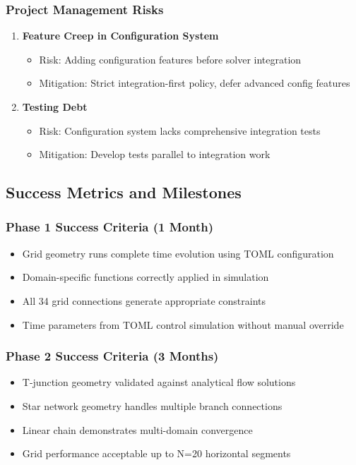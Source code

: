 \subsubsection{Project Management Risks}
\begin{enumerate}
    \item \textbf{Feature Creep in Configuration System}
    \begin{itemize}
        \item Risk: Adding configuration features before solver integration
        \item Mitigation: Strict integration-first policy, defer advanced config features
    \end{itemize}
    
    \item \textbf{Testing Debt}
    \begin{itemize}
        \item Risk: Configuration system lacks comprehensive integration tests
        \item Mitigation: Develop tests parallel to integration work
    \end{itemize}
\end{enumerate}

\subsection{Success Metrics and Milestones}

\subsubsection{Phase 1 Success Criteria (1 Month)}
\begin{itemize}
    \item Grid geometry runs complete time evolution using TOML configuration
    \item Domain-specific functions correctly applied in simulation
    \item All 34 grid connections generate appropriate constraints
    \item Time parameters from TOML control simulation without manual override
\end{itemize}

\subsubsection{Phase 2 Success Criteria (3 Months)}
\begin{itemize}
    \item T-junction geometry validated against analytical flow solutions
    \item Star network geometry handles multiple branch connections
    \item Linear chain demonstrates multi-domain convergence
    \item Grid performance acceptable up to N=20 horizontal segments
\end{itemize}


